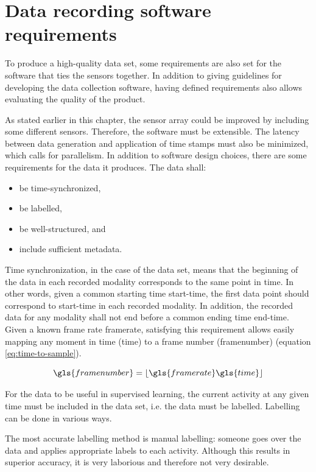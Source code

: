 \section{Data recording software requirements}
\label{sec:2-requirements}

To produce a high-quality data set,
some requirements are also set for the software that ties the sensors together.
In addition to giving guidelines for developing the data collection software,
having defined requirements also allows evaluating the quality of the product.

As stated earlier in this chapter,
the sensor array could be improved by including some different sensors.
Therefore, the software must be extensible.
The latency between data generation and application of time stamps must also be minimized,
which calls for parallelism.
In addition to software design choices, there are some requirements for the data it produces.
The data shall:
\begin{itemize}
    \item be time-synchronized,
    \item be labelled,
    \item be well-structured, and
    \item include sufficient metadata.
\end{itemize}

Time synchronization, in the case of the data set,
means that the beginning of the data in each recorded modality
corresponds to the same point in time.
In other words, given a common starting time \gls{start-time},
the first data point should correspond to \gls{start-time} in each recorded modality.
In addition, the recorded data for any modality shall not end before a common ending time \gls{end-time}.
Given a known frame rate \gls{framerate},
satisfying this requirement allows easily mapping any moment in time (\gls{time}) to a frame number (\gls{framenumber}) (equation \ref{eq:time-to-sample}).

\begin{equation}
    \label{eq:time-to-sample}
    \gls{framenumber} = \lfloor \gls{framerate} \gls{time} \rfloor
\end{equation}

For the data to be useful in supervised learning,
the current activity at any given time must be included in the data set, i.e. the data must be labelled.
Labelling can be done in various ways.

The most accurate labelling method is manual labelling:
someone goes over the data and applies appropriate labels to each activity.
Although this results in superior accuracy,
it is very laborious and therefore not very desirable.

